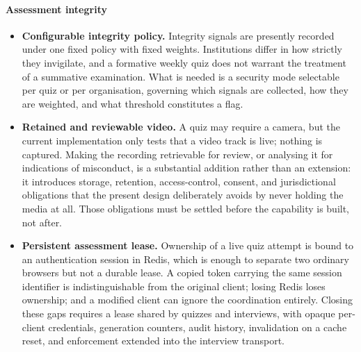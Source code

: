 \paragraph{Assessment integrity}
\begin{itemize}
    \item \textbf{Configurable integrity policy.} Integrity signals are presently recorded under one fixed policy with fixed weights. Institutions differ in how strictly they invigilate, and a formative weekly quiz does not warrant the treatment of a summative examination. What is needed is a security mode selectable per quiz or per organisation, governing which signals are collected, how they are weighted, and what threshold constitutes a flag.

    \item \textbf{Retained and reviewable video.} A quiz may require a camera, but the current implementation only tests that a video track is live; nothing is captured. Making the recording retrievable for review, or analysing it for indications of misconduct, is a substantial addition rather than an extension: it introduces storage, retention, access-control, consent, and jurisdictional obligations that the present design deliberately avoids by never holding the media at all. Those obligations must be settled before the capability is built, not after.

    \item \textbf{Persistent assessment lease.} Ownership of a live quiz attempt is bound to an authentication session in Redis, which is enough to separate two ordinary browsers but not a durable lease. A copied token carrying the same session identifier is indistinguishable from the original client; losing Redis loses ownership; and a modified client can ignore the coordination entirely. Closing these gaps requires a lease shared by quizzes and interviews, with opaque per-client credentials, generation counters, audit history, invalidation on a cache reset, and enforcement extended into the interview transport.
\end{itemize}

